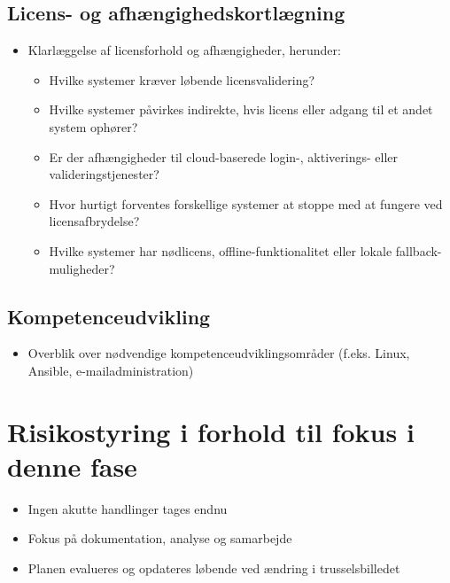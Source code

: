 \documentclass[a4paper,11pt,oneside]{book}
\def\tightlist{}
\begin{document}
\subsection{Licens- og
afhængighedskortlægning}\label{licens--og-afhuxe6ngighedskortluxe6gning}

\begin{itemize}
\item
  Klarlæggelse af licensforhold og afhængigheder, herunder:

  \begin{itemize}
  \tightlist
  \item
    Hvilke systemer kræver løbende licensvalidering?
  \item
    Hvilke systemer påvirkes indirekte, hvis licens eller adgang til et
    andet system ophører?
  \item
    Er der afhængigheder til cloud-baserede login-, aktiverings- eller
    valideringstjenester?
  \item
    Hvor hurtigt forventes forskellige systemer at stoppe med at fungere
    ved licensafbrydelse?
  \item
    Hvilke systemer har nødlicens, offline-funktionalitet eller lokale
    fallback-muligheder?
  \end{itemize}
\end{itemize}

\subsection{Kompetenceudvikling}\label{kompetenceudvikling}

\begin{itemize}
\tightlist
\item
  Overblik over nødvendige kompetenceudviklingsområder (f.eks. Linux,
  Ansible, e-mailadministration)
\end{itemize}

\section{Risikostyring i forhold til fokus i denne
fase}\label{risikostyring-i-forhold-til-fokus-i-denne-fase}

\begin{itemize}
\tightlist
\item
  Ingen akutte handlinger tages endnu
\item
  Fokus på dokumentation, analyse og samarbejde
\item
  Planen evalueres og opdateres løbende ved ændring i trusselsbilledet
\end{itemize}
\end{document}
